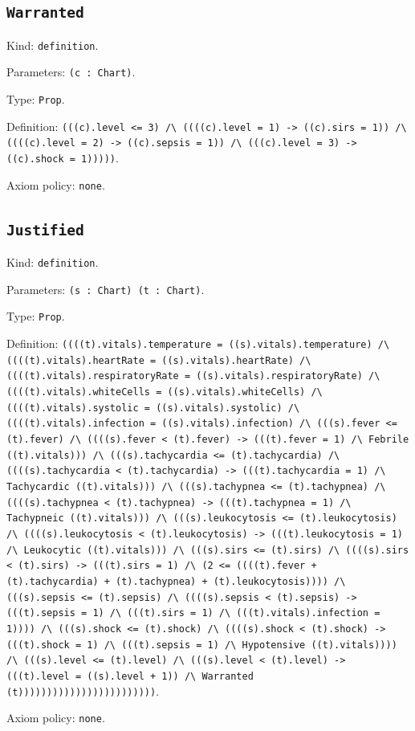 \documentclass[11pt]{article}
\begin{document}
\subsection*{\texttt{Warranted}}
\noindent Kind: \texttt{definition}.\par
\noindent Parameters: \texttt{(c : Chart)}.\par
\noindent Type: \texttt{Prop}.\par
\noindent Definition: \texttt{(((c).level <= 3) /\textbackslash{} ((((c).level = 1) -> ((c).sirs = 1)) /\textbackslash{} ((((c).level = 2) -> ((c).sepsis = 1)) /\textbackslash{} (((c).level = 3) -> ((c).shock = 1)))))}.\par
\noindent Axiom policy: \texttt{none}.\par
\subsection*{\texttt{Justified}}
\noindent Kind: \texttt{definition}.\par
\noindent Parameters: \texttt{(s : Chart) (t : Chart)}.\par
\noindent Type: \texttt{Prop}.\par
\noindent Definition: \texttt{((((t).vitals).temperature = ((s).vitals).temperature) /\textbackslash{} ((((t).vitals).heartRate = ((s).vitals).heartRate) /\textbackslash{} ((((t).vitals).respiratoryRate = ((s).vitals).respiratoryRate) /\textbackslash{} ((((t).vitals).whiteCells = ((s).vitals).whiteCells) /\textbackslash{} ((((t).vitals).systolic = ((s).vitals).systolic) /\textbackslash{} ((((t).vitals).infection = ((s).vitals).infection) /\textbackslash{} (((s).fever <= (t).fever) /\textbackslash{} ((((s).fever < (t).fever) -> (((t).fever = 1) /\textbackslash{} Febrile ((t).vitals))) /\textbackslash{} (((s).tachycardia <= (t).tachycardia) /\textbackslash{} ((((s).tachycardia < (t).tachycardia) -> (((t).tachycardia = 1) /\textbackslash{} Tachycardic ((t).vitals))) /\textbackslash{} (((s).tachypnea <= (t).tachypnea) /\textbackslash{} ((((s).tachypnea < (t).tachypnea) -> (((t).tachypnea = 1) /\textbackslash{} Tachypneic ((t).vitals))) /\textbackslash{} (((s).leukocytosis <= (t).leukocytosis) /\textbackslash{} ((((s).leukocytosis < (t).leukocytosis) -> (((t).leukocytosis = 1) /\textbackslash{} Leukocytic ((t).vitals))) /\textbackslash{} (((s).sirs <= (t).sirs) /\textbackslash{} ((((s).sirs < (t).sirs) -> (((t).sirs = 1) /\textbackslash{} (2 <= ((((t).fever + (t).tachycardia) + (t).tachypnea) + (t).leukocytosis)))) /\textbackslash{} (((s).sepsis <= (t).sepsis) /\textbackslash{} ((((s).sepsis < (t).sepsis) -> (((t).sepsis = 1) /\textbackslash{} (((t).sirs = 1) /\textbackslash{} (((t).vitals).infection = 1)))) /\textbackslash{} (((s).shock <= (t).shock) /\textbackslash{} ((((s).shock < (t).shock) -> (((t).shock = 1) /\textbackslash{} (((t).sepsis = 1) /\textbackslash{} Hypotensive ((t).vitals)))) /\textbackslash{} (((s).level <= (t).level) /\textbackslash{} (((s).level < (t).level) -> (((t).level = ((s).level + 1)) /\textbackslash{} Warranted (t))))))))))))))))))))))))}.\par
\noindent Axiom policy: \texttt{none}.\par
\end{document}
